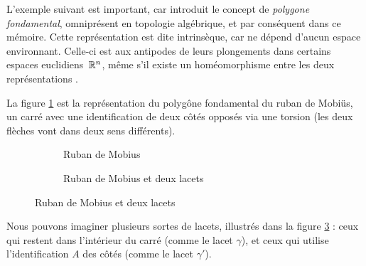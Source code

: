 L'exemple suivant est important, car introduit le concept de \emph{polygone fondamental}, omniprésent en topologie algébrique, et par conséquent dans ce mémoire. Cette représentation est dite intrinsèque, car ne dépend d'aucun espace environnant. Celle-ci est aux antipodes de leurs plongements dans certains espaces euclidiens~$\mathbb{R}^n$, même s'il existe un homéomorphisme entre les deux représentations \cite{Homeo-article}.

\begin{exemple}
La figure \ref{tkz:mobius} est la représentation du polygône fondamental du ruban de Mobiüs, un carré avec une identification de deux côtés opposés via une torsion (les deux flèches vont dans deux sens différents).
\begin{figure}[H]
\centering
\begin{subfigure}[b]{0.45\linewidth}
\centering
{}
\caption{Ruban de Mobius}
\label{tkz:mobius}
\end{subfigure}
\begin{subfigure}[b]{0.45\linewidth}
\centering
{}
\caption{Ruban de Mobius et deux lacets}
\label{tkz:mobius-loops}
\end{subfigure}
\end{figure}

Nous pouvons imaginer plusieurs sortes de lacets, illustrés dans la figure \ref{tkz:mobius-loops} : ceux qui restent dans l'intérieur du carré (comme le lacet $\gamma$), et ceux qui utilise l'identification $A$ des côtés (comme le lacet $\gamma'$).
\end{exemple}

